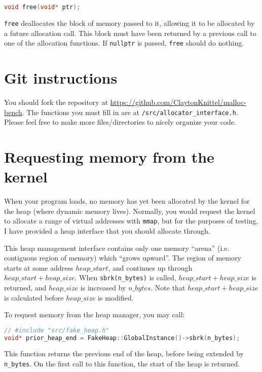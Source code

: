 \documentclass{article}
\begin{document}
\begin{lstlisting}[language=C++]
void free(void* ptr);
\end{lstlisting}

\texttt{free} deallocates the block of memory passed to it, allowing it to be allocated by a future allocation call. This block must have been returned by a previous call to one of the allocation functions. If \texttt{nullptr} is passed, \texttt{free} should do nothing.

\section*{Git instructions}

You should fork the repository at \url{https://github.com/ClaytonKnittel/malloc-bench}. The functions you must fill in are at \texttt{/src/allocator\_interface.h}. Please feel free to make more files/directories to nicely organize your code.

\section*{Requesting memory from the kernel}

When your program loads, no memory has yet been allocated by the kernel for the heap (where dynamic memory lives). Normally, you would request the kernel to allocate a range of virtual addresses with \texttt{mmap}, but for the purposes of testing, I have provided a heap interface that you should allocate through.

This heap management interface contains only one memory ``arena'' (i.e. contiguous region of memory) which ``grows upward''. The region of memory starts at some address $heap\_start$, and continues up through $heap\_start+heap\_size$. When \texttt{sbrk(n\_bytes)} is called, $heap\_start+heap\_size$ is returned, and $heap\_size$ is increased by $n\_bytes$. Note that $heap\_start+heap\_size$ is calculated before $heap\_size$ is modified.

To request memory from the heap manager, you may call:

\begin{lstlisting}[language=C++]
// #include "src/fake_heap.h"
void* prior_heap_end = FakeHeap::GlobalInstance()->sbrk(n_bytes);
\end{lstlisting}

This function returns the previous end of the heap, before being extended by \texttt{n\_bytes}. On the first call to this function, the start of the heap is returned.
\end{document}
